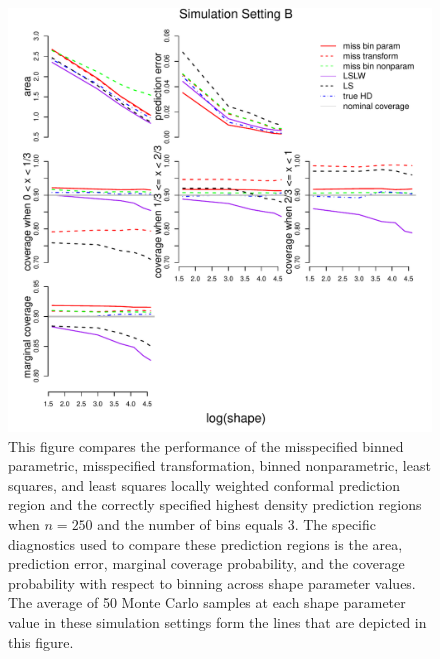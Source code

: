 \documentclass[11pt]{article}\usepackage[]{graphicx}\usepackage[]{color}
\makeatletter
\def\maxwidth{ %
  \ifdim\Gin@nat@width>\linewidth
    \linewidth
  \else
    \Gin@nat@width
  \fi
}
\newenvironment{knitrout}{}{} %
\makeatother
\begin{document}
\newpage
\begin{figure}[h!]
\begin{center}
\begin{knitrout}
\color{fgcolor}
\includegraphics[width=\maxwidth]{figure/Fig-misspec-250-1} 

\end{knitrout}
\end{center}
\caption{This figure compares the performance of the 
  misspecified binned parametric,
  misspecified transformation, 
  binned nonparametric,
  least squares, and 
  least squares locally weighted conformal prediction region and the 
  correctly specified highest density prediction regions when $n = 250$ 
  and the number of bins equals 3.  
  The specific diagnostics used to compare these prediction regions is the 
    area,
    prediction error, 
    marginal coverage probability,     
    and the coverage probability with respect to binning 
    across shape parameter values.
  The average of 50 Monte Carlo samples at each shape parameter value in 
  these simulation settings form the lines that are depicted in this figure.}
\label{Fig:misspec.250}
\end{figure}
\end{document}

